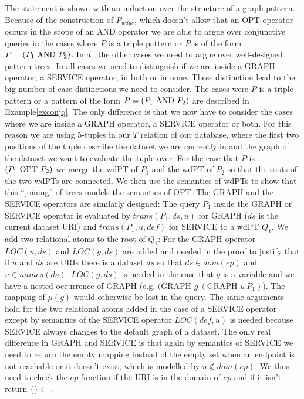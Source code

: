 \begin{proofidea}
	The statement is shown with an induction over the
	structure of a graph pattern.
	Because of the construction of $P_{wdgs}$, which doesn't allow
	that an OPT operator occurs in the scope of an AND operator we are able to
	argue over conjunctive queries in the cases where $P$ is a triple pattern or
	$P$ is of the form $P = (P_1 \mbox{ AND } P_2)$. In all the other cases we
	need to argue over well-designed pattern trees. In all cases we need to
	distinguish if we are inside a GRAPH operator, a SERVICE operator, in
	both or in none. These distinction lead to the big number of case
	distinctions we need to consider.
	The cases were $P$ is a triple pattern or a pattern of the form $P=(P_1 \mbox{ AND }
	P_2)$ are described in Example\ref{exconjq}. The only difference is that we
	now have to consider the cases where we are inside a GRAPH operator, a SERVICE
	operator or both. For this reason we are using 5-tuples in our $T$ relation
	of our database, where the first two positions of the tuple describe the
	dataset we are currently in and the graph of the dataset we want to evaluate
	the tuple over. For the case that $P$ is $(P_1 \mbox{ OPT } P_2)$ we merge the wdPT
	of $P_1$ and the wdPT of $P_2$ so that the roots of the two wdPTs are
	connected. We then use the semantics of wdPTs to show that this ``joining''
	of trees models the semantics of OPT. 
	The GRAPH and the SERVICE operators are similarly designed:
	The query $P_1$ inside the GRAPH or SERVICE operator is evaluated by
	$trans(P_1,ds,u)$ for GRAPH ($ds$ is the current dataset URI) and
	$trans(P_1,u,def)$ for SERVICE to a wdPT $Q_1$. We add two relational
	atoms to the root of $Q_1$: For the GRAPH operator $LOC(u,ds)$ and $LOC(g,ds)$ are added and
	needed in the proof to justify that if $u$ and $ds$ are URIs there is a
	dataset $ds$ so that $ds \in dom(ep)$ and $u \in names(ds)$. $LOC(g,ds)$ is
	needed in the case that $g$ is a variable and we have a nested occurrence of
	GRAPH (e.g. $(\mbox{GRAPH } g \ (\mbox{GRAPH } u \ P_1)$). The mapping of $\mu(g)$ would
	otherwise be lost in the query. The same arguments hold for the two
	relational atoms added in the case of a SERVICE operator
	except by semantics of the SERVICE operator $LOC(def,u)$ is needed because
	SERVICE always changes to the default graph of a dataset.
	The only real difference in GRAPH and SERVICE is that again by semantics of
	SERVICE we need to return the empty mapping instead of the empty set when an endpoint is not
	reachable or it doesn't exist, which is modelled by $u \notin dom(ep)$. We
	thus need to check the $ep$ function if the URI is in the domain of $ep$ and
	if it isn't return $\{\} \leftarrow$. 
\end{proofidea}

